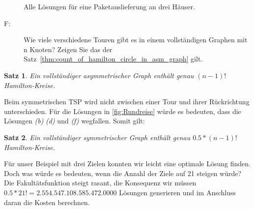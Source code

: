 \documentclass{article}
\newtheorem{mysat}{Satz}
\begin{document}
\begin{figure}[!h]
\begin{subfigure}{0.3\linewidth}
	\end{subfigure}
	\begin{subfigure}{0.3\linewidth}
		\centering
	\end{subfigure}
	\caption{Alle Lösungen für eine Paketauslieferung an drei Häuser.}
	\label{fig:Rundreise}
\end{figure}

\begin{description}
	\item[F:] Wie viele verschiedene Touren gibt es in einem vollständigen Graphen mit n Knoten? Zeigen Sie das der Satz~\autoref{thm:count_of_hamilton_circle_in_asm_graph} gilt.
\end{description}

\begin{mysat}\label{thm:count_of_hamilton_circle_in_asm_graph}
	Ein vollständiger asymmetrischer Graph enthält genau $(n-1)!$ Hamilton-Kreise.
\end{mysat}

Beim symmetrischen TSP wird nicht zwischen einer Tour und ihrer Rückrichtung unterschieden. Für die Lösungen in \autoref{fig:Rundreise} würde es bedeuten, dass die Lösungen \textit{(b)} \textit{(d)} und \textit{(f)} wegfallen. Somit gilt:

\begin{mysat}
	Ein vollständiger symmetrischer Graph enthält genau $0.5 * (n-1)!$ Hamilton-Kreise.
\end{mysat}

Für unser Beispiel mit drei Zielen konnten wir leicht eine optimale Lösung finden. Doch was würde es bedeuten, wenn die Anzahl der Ziele auf 21 steigen würde? Die Fakultätsfunktion steigt rasant, die Konsequenz wir müssen $0.5 * 21! = 2.554.547.108.585.472.0000$ Lösungen generieren und im Anschluss daran die Kosten berechnen.
\end{document}
